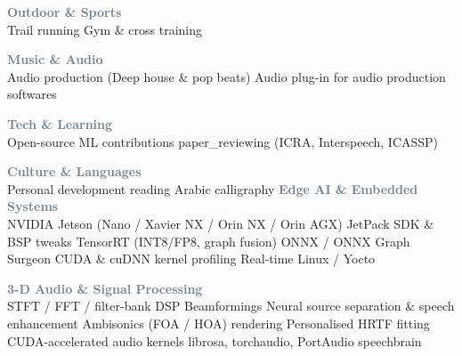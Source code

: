 \documentclass[9pt,a4paper,ragged2e]{altacv}
\begin{document}
\begin{paracol}{2}
\vspace{4pt}
\textcolor{SlateGrey}{\textbf{Outdoor \& Sports}}\\
Trail running \textbar{} Gym \& cross training

\vspace{1pt}

\textcolor{SlateGrey}{\textbf{Music \& Audio}}\\
Audio production (Deep house \& pop beats) \textbar{} Audio plug-in for audio production softwares

\vspace{1pt}

\textcolor{SlateGrey}{\textbf{Tech \& Learning}}\\
Open-source ML contributions \textbar{} paper\_reviewing (ICRA, Interspeech, ICASSP)

\vspace{1pt}

\textcolor{SlateGrey}{\textbf{Culture \& Languages}}\\
Personal development reading \textbar{} Arabic calligraphy
\switchcolumn
{}
\vspace{2pt}
\textcolor{SlateGrey}{\textbf{Edge AI \& Embedded Systems}}\\
NVIDIA Jetson (Nano / Xavier NX / Orin NX / Orin AGX) \textbar{} JetPack SDK \& BSP tweaks \textbar{} TensorRT (INT8/FP8, graph fusion) \textbar{} ONNX / ONNX Graph Surgeon \textbar{} CUDA \& cuDNN kernel profiling \textbar{} Real-time Linux / Yocto

\vspace{0.5pt}

\textcolor{SlateGrey}{\textbf{3-D Audio \& Signal Processing}}\\
STFT / FFT / filter-bank DSP \textbar{} Beamformings \textbar{} Neural source separation \& speech enhancement \textbar{} Ambisonics (FOA / HOA) rendering \textbar{} Personalised HRTF fitting \textbar{} CUDA-accelerated audio kernels \textbar{} librosa, torchaudio, PortAudio \textbar{} speechbrain


\end{paracol}
\end{document}
